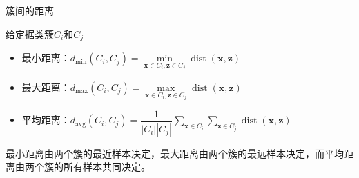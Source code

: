 \begin{note}
    \textcolor{main1}{簇间的距离}

    给定据类簇$C_i$和$C_j$
    \begin{itemize}
        \item \textcolor{main1}{最小距离：}$ d_{\min}\left( C_i,C_j \right) = \min\limits_{\boldsymbol{x}\in C_{i},\boldsymbol{z}\in C_{j}} \operatorname{dist}\left( \boldsymbol{x},\boldsymbol{z} \right) $
        \item \textcolor{main1}{最大距离：}$ d_{\max}\left( C_i,C_j \right) = \max\limits_{\boldsymbol{x}\in C_{i},\boldsymbol{z}\in C_{j}} \operatorname{dist}\left( \boldsymbol{x},\boldsymbol{z} \right) $
        \item \textcolor{main1}{平均距离：}$ d_{\operatorname{avg}}\left( C_i,C_j \right) = \dfrac{1}{|C_i||C_j|}\sum\limits_{\boldsymbol{x}\in C_{i}}\sum\limits_{\boldsymbol{z}\in C_{j}} \operatorname{dist}\left( \boldsymbol{x},\boldsymbol{z} \right) $
    \end{itemize}

    \textcolor{main1}{最小距离}由两个簇的\textcolor{main1}{最近样本}决定，\textcolor{main1}{最大距离}由两个簇的\textcolor{main1}{最远样本}决定，而\textcolor{main1}{平均距离}由两个簇的\textcolor{main1}{所有样本}共同决定。
\end{note}

